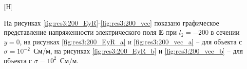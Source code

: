 \documentclass[a4paper,14pt]{article}
\makeatletter
\renewenvironment{figure}[1][\fps@figure]{
  \edef\@tempa{\noexpand\@float{figure}[#1]}
  \@tempa
  \addtocounter{foofigure}{1}
}{
  \end@float
}
\renewcommand{\Re}{\mathop{\mathrm{Re}}\nolimits}
\makeatother
\begin{document}
\begin{figure}[H]
	\centering
	\text{~~}
	\caption{$\Re(\mathbf{E}_z)$ при $l_2=-100$}
	\label{fig:res3:100_EzR}
\end{figure}

На рисунках \ref{fig:res3:200_EyR}-\ref{fig:res3:200_vec} показано графическое представление напряженности электрического поля $\mathbf{E}$ при $l_2=-200$ в сечении $y=0$, на рисунках \ref{fig:res3:200_EyR_a} и \ref{fig:res3:200_vec_a} -- для объекта с $\sigma=10^{-2}$~См/м, на рисунках \ref{fig:res3:200_EyR_b} и \ref{fig:res3:200_vec_b} -- для объекта с $\sigma=10^{2}$~См/м.
\end{document}
